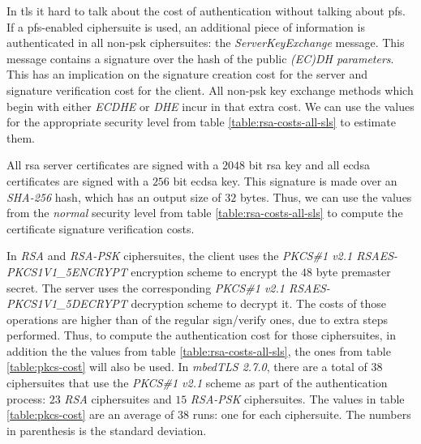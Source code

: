 In \gls{tls} it hard to talk about the cost of authentication without  talking about \gls{pfs}. If a \gls{pfs}-enabled
ciphersuite is used, an additional piece of information is authenticated in all non-\gls{psk} ciphersuites: the \textit{ServerKeyExchange} message.
This message contains a signature over the hash of the public \textit{(EC)DH parameters}. This has an implication on the signature creation cost
for the server and signature verification cost for the client. All non-\gls{psk} key exchange methods which begin with either
\textit{ECDHE} or \textit{DHE} incur in that extra cost.  We can use the values for the appropriate security level from table
\ref{table:rsa-costs-all-sls} to estimate them.

All \gls{rsa} server certificates are signed with a $2048$ bit \gls{rsa} key and all \gls{ecdsa} certificates
are signed with a $256$ bit \gls{ecdsa} key. This signature is made over an \textit{SHA-256} hash, which has an output size of $32$ bytes.
Thus, we can use the values from the \textit{normal} security level from table \ref{table:rsa-costs-all-sls} to compute the certificate signature
verification costs.

In \textit{RSA} and \textit{RSA-PSK} ciphersuites, the client uses the \textit{PKCS\#1 v2.1 RSAES-PKCS1\-V1\_5\-ENCRYPT}\cite{RFC3447}
encryption scheme to encrypt  the $48$ byte premaster secret. The server uses the corresponding \textit{PKCS\#1 v2.1 RSAES-PKCS1\-V1\_5\-DECRYPT}\cite{RFC3447}
decryption scheme to decrypt it. The costs of those operations are higher than of the regular sign/verify ones, due to extra steps performed.
Thus, to compute the authentication cost for those ciphersuites, in addition the the values from table \ref{table:rsa-costs-all-sls}, the ones
from table \ref{table:pkcs-cost} will also be used. In \textit{mbedTLS 2.7.0}, there are a total of
$38$ ciphersuites that use the \textit{PKCS\#1 v2.1} scheme as part of the authentication process: $23$
\textit{RSA} ciphersuites and $15$ \textit{RSA-PSK} ciphersuites. The values in table \ref{table:pkcs-cost} are an average
of $38$ runs: one for each ciphersuite. The numbers in parenthesis is the standard deviation.

\begin{table}[]
  \centering \caption{\label{table:pkcs-cost} Cost of using \textit{PKCS\#1 V2.1 RSAES-PKCS1-v1\_5} encryption and decryption schemes with various security levels}
  \end{table}

